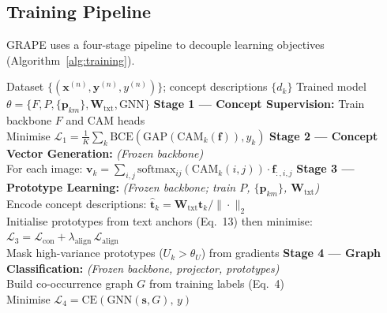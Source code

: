 \documentclass{article}
\begin{document}
\subsection{Training Pipeline}
\label{sec:training}

GRAPE uses a four-stage pipeline to decouple learning objectives (Algorithm~\ref{alg:training}).

\begin{algorithm}[t]
\caption{GRAPE Four-Stage Training Pipeline}
\label{alg:training}
\begin{algorithmic}[1]
\REQUIRE Dataset $\{(\mathbf{x}^{(n)}, \mathbf{y}^{(n)}, y^{(n)})\}$; concept descriptions $\{d_k\}$
\ENSURE Trained model $\theta = \{F, P, \{\mathbf{p}_{km}\}, \mathbf{W}_\text{txt}, \text{GNN}\}$
\STATE \textbf{Stage 1 — Concept Supervision:} Train backbone $F$ and CAM heads\\
\hspace{1em} Minimise $\mathcal{L}_1 = \frac{1}{K}\sum_k \text{BCE}(\text{GAP}(\text{CAM}_k(\mathbf{f})), y_k)$
\STATE \textbf{Stage 2 — Concept Vector Generation:} \textit{(Frozen backbone)}\\
\hspace{1em} For each image: $\mathbf{v}_k = \sum_{i,j}\text{softmax}_{ij}(\text{CAM}_k(i,j))\cdot\mathbf{f}_{:,i,j}$
\STATE \textbf{Stage 3 — Prototype Learning:} \textit{(Frozen backbone; train $P$, $\{\mathbf{p}_{km}\}$, $\mathbf{W}_\text{txt}$)}\\
\hspace{1em} Encode concept descriptions: $\hat{\mathbf{t}}_k = \mathbf{W}_\text{txt}\mathbf{t}_k / \|\cdot\|_2$\\
\hspace{1em} Initialise prototypes from text anchors (Eq.~13) then minimise:\\
\hspace{1em} $\mathcal{L}_3 = \mathcal{L}_\text{con} + \lambda_\text{align}\,\mathcal{L}_\text{align}$\\
\hspace{1em} Mask high-variance prototypes ($U_k > \theta_U$) from gradients
\STATE \textbf{Stage 4 — Graph Classification:} \textit{(Frozen backbone, projector, prototypes)}\\
\hspace{1em} Build co-occurrence graph $G$ from training labels (Eq.~4)\\
\hspace{1em} Minimise $\mathcal{L}_4 = \text{CE}(\text{GNN}(\mathbf{s}, G),\, y)$
\end{algorithmic}
\end{algorithm}
\end{document}

